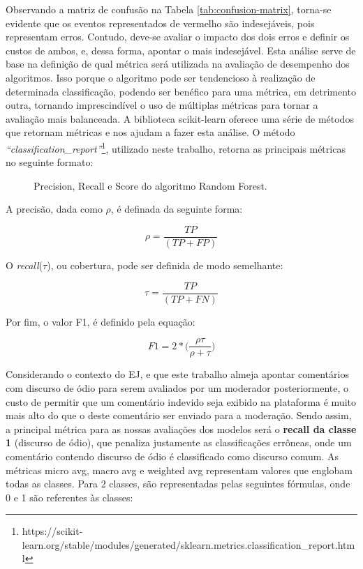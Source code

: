 Observando a matriz de confusão na Tabela \ref{tab:confusion-matrix}, torna-se evidente que os eventos representados de vermelho são indesejáveis, pois representam erros. Contudo, deve-se avaliar o impacto dos dois erros e definir os custos de ambos, e, dessa forma, apontar o mais indesejável. Esta análise serve de base na definição de qual métrica será utilizada na avaliação de desempenho dos algoritmos. Isso porque o algoritmo pode ser tendencioso à realização de determinada classificação, podendo ser benéfico para uma métrica, em detrimento outra, tornando imprescindível o uso de múltiplas métricas para tornar a avaliação mais balanceada.
A biblioteca scikit-learn oferece uma série de métodos que retornam métricas e nos ajudam a fazer esta análise. O método \textit{“classification\_report”}\footnote{https://scikit-learn.org/stable/modules/generated/sklearn.metrics.classification\_report.html}, utilizado neste trabalho, retorna as principais métricas no seguinte formato:

\begin{figure}[!htb]
    \caption{\label{fig:results} Precision, Recall e Score do algoritmo Random Forest.}
\end{figure}

 A precisão, dada como $\rho$, é definada da seguinte forma:
 
 $$ \rho=\frac{TP}{(TP+FP)} $$

O \textit{recall}($\tau$), ou cobertura, pode ser definida de modo semelhante:

$$ \tau = \frac{TP}{(TP+FN)}$$

Por fim, o valor F1, é definido pela equação:

$$F1 = 2*\Bigg(\frac{\rho\tau}{\rho+\tau}\Bigg)$$

Considerando o contexto do EJ, e que este trabalho almeja apontar comentários com discurso de ódio para serem avaliados por um moderador posteriormente, o custo de permitir que um comentário indevido seja exibido na plataforma é muito mais alto do que o deste comentário ser enviado para a moderação. Sendo assim, a principal métrica para as nossas avaliações dos modelos será o \textbf{recall da classe 1} (discurso de ódio), que penaliza justamente as classificações errôneas, onde um comentário contendo discurso de ódio é classificado como discurso comum.
As métricas micro avg, macro avg e weighted avg representam valores que englobam todas as classes. Para 2 classes, são representadas pelas seguintes fórmulas, onde 0 e 1 são referentes às classes:


